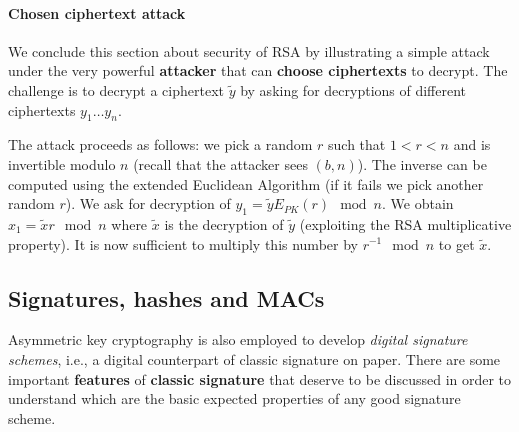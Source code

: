 \paragraph{Chosen ciphertext attack}
We conclude this section about security of RSA by illustrating a simple attack under the very powerful \textbf{attacker} that can \textbf{choose ciphertexts} to decrypt. The challenge is to decrypt a ciphertext $\tilde{y}$ by asking for decryptions of different ciphertexts ${y_1} \ldots {y_n}$. 

The attack proceeds as follows: we pick a random $r$ such that $1 < r < n$ and is invertible modulo $n$ (recall that the attacker sees $(b,n)$). The inverse can be computed using the extended Euclidean Algorithm (if it fails we pick another random $r$). We ask for decryption of $y_1 = \tilde{y} E_{PK}(r) \mod n$. We obtain $x_1 = \tilde{x} r \mod n$ where $\tilde{x}$ is the decryption of $\tilde{y}$ (exploiting the RSA multiplicative property). It is now sufficient to multiply this number by $r^{-1} \mod n$ to get $\tilde{x}$.


\subsection{Signatures, hashes and MACs}
Asymmetric key cryptography is also employed to develop \textit{digital signature schemes}, i.e., a digital counterpart of classic signature on paper. There are some important \textbf{features} of \textbf{classic signature} that deserve to be discussed in order to understand which are the basic expected properties of any good signature scheme.

